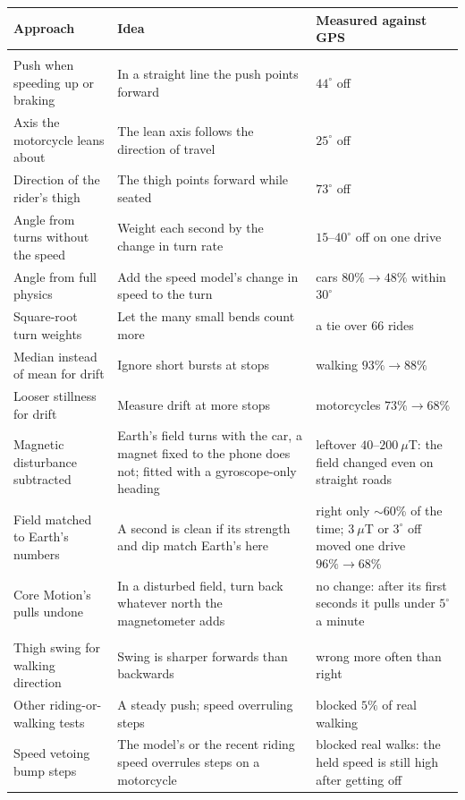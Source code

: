 \begin{tabular}{>{\raggedright\arraybackslash}p{}>{\raggedright\arraybackslash}p{}>{\raggedright\arraybackslash}p{}}
\toprule
Approach & Idea & Measured against GPS\\
\midrule
\multicolumn{3}{l}{\emph{Direction}}\\
Push when speeding up or braking & In a straight line the push points forward & $44^\circ$ off\\
Axis the motorcycle leans about & The lean axis follows the direction of travel & $25^\circ$ off\\
Direction of the rider's thigh & The thigh points forward while seated & $73^\circ$ off\\
Angle from turns without the speed & Weight each second by the change in turn rate & $15$--$40^\circ$ off on one drive\\
Angle from full physics & Add the speed model's change in speed to the turn & cars $80\% \to 48\%$ within $30^\circ$\\
Square-root turn weights & Let the many small bends count more & a tie over $66$ rides\\
Median instead of mean for drift & Ignore short bursts at stops & walking $93\% \to 88\%$\\
Looser stillness for drift & Measure drift at more stops & motorcycles $73\% \to 68\%$\\
Magnetic disturbance subtracted & Earth's field turns with the car, a magnet fixed to the phone does not; fitted with a gyroscope-only heading & leftover $40$--$200~\mu$T: the field changed even on straight roads\\
Field matched to Earth's numbers & A second is clean if its strength and dip match Earth's here & right only $\sim$60\% of the time; $3~\mu$T or $3^\circ$ off moved one drive $96\% \to 68\%$\\
Core Motion's pulls undone & In a disturbed field, turn back whatever north the magnetometer adds & no change: after its first seconds it pulls under $5^\circ$ a minute\\
\midrule
\multicolumn{3}{l}{\emph{Walking, riding and the air}}\\
Thigh swing for walking direction & Swing is sharper forwards than backwards & wrong more often than right\\
Other riding-or-walking tests & A steady push; speed overruling steps & blocked $5\%$ of real walking\\
Speed vetoing bump steps & The model's or the recent riding speed overrules steps on a motorcycle & blocked real walks: the held speed is still high after getting off\\

\end{tabular}
